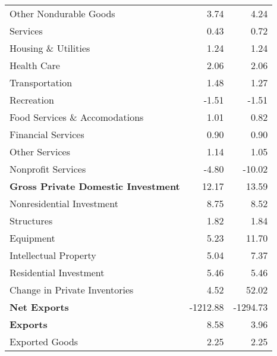 \documentclass[11pt, letterpaper]{article}\usepackage[]{graphicx}\usepackage[]{color}
\begin{document}
\begin{table}[H]
\begin{tabular}{lrr}
  \hspace{24mm}  Other Nondurable Goods & 3.74 & 4.24 \\ 
  \hspace{8mm}  Services & 0.43 & 0.72 \\ 
  \hspace{16mm}  Housing \& Utilities & 1.24 & 1.24 \\ 
  \hspace{16mm}  Health Care & 2.06 & 2.06 \\ 
  \hspace{16mm}  Transportation & 1.48 & 1.27 \\ 
  \hspace{16mm}  Recreation & -1.51 & -1.51 \\ 
  \hspace{16mm}  Food Services \& Accomodations & 1.01 & 0.82 \\ 
  \hspace{16mm}  Financial Services & 0.90 & 0.90 \\ 
  \hspace{16mm}  Other Services & 1.14 & 1.05 \\ 
  \hspace{16mm}  Nonprofit Services & -4.80 & -10.02 \\ 
  \hspace{0mm} \textbf{Gross Private Domestic Investment} & 12.17 & 13.59 \\ 
  \hspace{8mm}  Nonresidential Investment & 8.75 & 8.52 \\ 
  \hspace{16mm}  Structures & 1.82 & 1.84 \\ 
  \hspace{16mm}  Equipment & 5.23 & 11.70 \\ 
  \hspace{16mm}  Intellectual Property & 5.04 & 7.37 \\ 
  \hspace{8mm}  Residential Investment & 5.46 & 5.46 \\ 
  \hspace{8mm}  Change in Private Inventories & 4.52 & 52.02 \\ 
  \hspace{0mm} \textbf{Net Exports} & -1212.88 & -1294.73 \\ 
  \hspace{0mm} \textbf{Exports} & 8.58 & 3.96 \\ 
  \hspace{8mm}  Exported Goods & 2.25 & 2.25 \\ 

\end{tabular}
\end{table}
\end{document}
